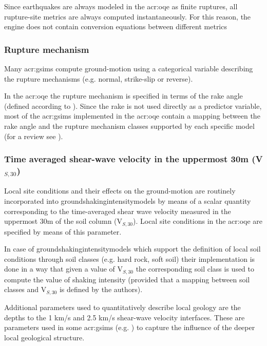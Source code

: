 Since earthquakes are always modeled in the \gls{acr:oqe} as finite ruptures, 
all rupture-site metrics are always computed instantaneously. For this reason,
the engine does not contain conversion equations between different metrics
\parencite[see for example][]{scherbaum2004}
% 
\subsubsection{Rupture mechanism}
Many \glspl{acr:gsim} compute ground-motion using a 
categorical variable describing the rupture mechanisms (e.g. normal,
strike-slip or reverse).

In the \gls{acr:oqe} the rupture mechanism is specified 
in terms of the rake angle (defined according to \cite{aki2002}). 
%
Since the rake is not used directly as a predictor variable,
most of the \glspl{acr:gsim} implemented in the \gls{acr:oqe} contain 
a mapping between the rake angle and the rupture mechanism classes 
supported by each specific model (for a review see 
\cite[page 24 of][]{akkar2013r}).
% 
\subsubsection{Time averaged shear-wave velocity in the uppermost 30m 
(V$_{S,30}$)}
%
Local site conditions and their effects on the ground-motion are routinely 
incorporated into \glspl{groundshakingintensitymodel} by means of a scalar
quantity corresponding to the time-averaged shear wave velocity measured 
in the uppermost 30m of the soil column (V$_{S,30}$).
%
Local site conditions in the \gls{acr:oqe} are specified by means of this
parameter.

In case of \glspl{groundshakingintensitymodel} which support the definition 
of local soil conditions through soil classes (e.g. hard rock, soft soil) 
their implementation is done in a way that given a value of V$_{S,30}$ the
corresponding soil class is used to compute the value of shaking intensity 
(provided that a mapping between soil classes and V$_{S,30}$ is defined 
by the authors).

Additional parameters used to quantitatively describe local geology are 
the depths to the 1 km/s and 2.5 km/s shear-wave velocity interfaces. 
These are parameters used in some \glspl{acr:gsim} (e.g. \cite{chiou2008}) 
to capture the influence of the deeper local geological structure. 
%
